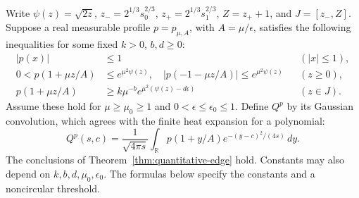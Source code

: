 \begin{proposition}
\label{prop:edge-profile}
Write $\psi(z)=\sqrt{2z}$, $z_-=2^{1/3}s_0^{2/3}$,
$z_+=2^{1/3}s_1^{2/3}$, $Z=z_++1$, and $J=[z_-,Z]$.
Suppose a real measurable profile $p=p_{\mu,A}$, with $A=\mu/\epsilon$,
satisfies the following inequalities for some fixed $k>0$, $b,d\ge0$:
\begin{align}
 |p(x)|&\le1 &&(|x|\le1),\label{eq:profile-interior}\\
 0<p(1+\mu z/A)&\le e^{\mu^2\psi(z)},\quad
 |p(-1-\mu z/A)|\le e^{\mu^2\psi(z)}
 &&(z\ge0),\label{eq:profile-envelope}\\
 p(1+\mu z/A)&\ge k\mu^{-b}
       e^{\mu^2(\psi(z)-d\epsilon)} &&(z\in J).
 \label{eq:profile-local-lower}
\end{align}
Assume these hold for $\mu\ge\mu_0\ge1$ and
$0<\epsilon\le\epsilon_0\le1$.  Define $Q^p$ by its Gaussian
convolution, which agrees with the finite heat expansion for a polynomial:
\[
 Q^p(s,c)=\frac1{\sqrt{4\pi s}}\int_{\mathbb R}
       p(1+y/A)e^{-(y-c)^2/(4s)}\,dy.
\]
The conclusions of Theorem~\ref{thm:quantitative-edge} hold.
Constants may also depend on $k,b,d,\mu_0,\epsilon_0$.
The formulas below specify the constants and a noncircular threshold.
\end{proposition}

